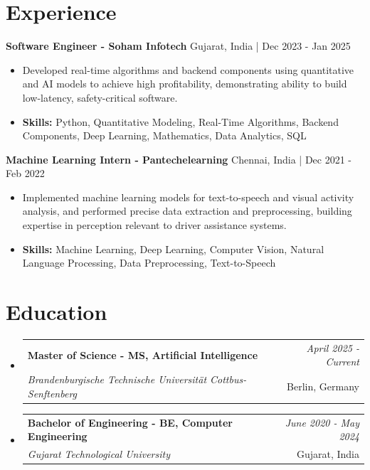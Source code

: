 \documentclass[a4paper,11pt]{article}
\makeatletter
\newcommand{\resumeSubheading}[4]{
\vspace{0.5mm}\item
    \begin{tabular*}{\linewidth}[t]{l@{\extracolsep{\fill}}r}
        \textbf{#1} & \textit{\footnotesize{#4}} \\
        \textit{\footnotesize{#3}} &  \footnotesize{#2}\\
    \end{tabular*}
    \vspace{-2.4mm}
}
\makeatother
\begin{document}
\section{\textbf{Experience}}


\vspace{1mm}
  \textbf{Software Engineer - Soham Infotech} \hfill Gujarat, India | Dec 2023 - Jan 2025
\vspace{-1.5mm} %
\begin{itemize}
  \item Developed real-time algorithms and backend components using quantitative and AI models to achieve high profitability, demonstrating ability to build low-latency, safety-critical software.

\vspace{-2mm}
  \item \textbf{Skills:} Python, Quantitative Modeling, Real-Time Algorithms, Backend Components, Deep Learning, Mathematics, Data Analytics, SQL
\end{itemize}

\vspace{1mm}
  \textbf{Machine Learning Intern - Pantechelearning} \hfill Chennai, India | Dec 2021 - Feb 2022
\vspace{-1.5mm} %
\begin{itemize}
  \item Implemented machine learning models for text-to-speech and visual activity analysis, and performed precise data extraction and preprocessing, building expertise in perception relevant to driver assistance systems.
\vspace{-2mm}
  \item \textbf{Skills:} Machine Learning, Deep Learning, Computer Vision, Natural Language Processing, Data Preprocessing, Text-to-Speech
\end{itemize}\section{\textbf{Education}}
\vspace{-0.4mm}

\begin{itemize}[leftmargin=0.15in, label={}]
\resumeSubheading
{Master of Science - MS, Artificial Intelligence }{Berlin, Germany}
{Brandenburgische Technische Universität Cottbus-Senftenberg  }{April 2025 - Current}

\vspace{1.0mm} %
\resumeSubheading
{Bachelor of Engineering - BE, Computer Engineering  }{Gujarat, India}
{Gujarat Technological University }{June 2020 - May 2024}

\end{itemize}
\end{document}
